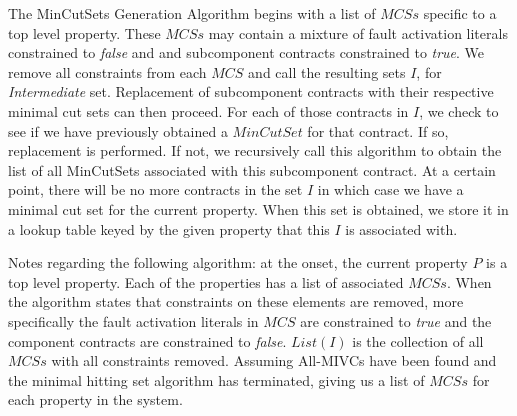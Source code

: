The MinCutSets Generation Algorithm begins with a list of $MCSs$ specific to a top level property. These $MCSs$ may contain a mixture of fault activation literals constrained to \textit{false} and %
and subcomponent contracts constrained to \textit{true}. We remove all constraints from each $MCS$ and call the resulting sets $I$, for \textit{Intermediate} set. Replacement of subcomponent contracts with their respective minimal cut sets can then proceed. For each of those contracts in $I$, we check to see if we have previously obtained a $MinCutSet$ for that contract. If so, replacement is performed. If not, we recursively call this algorithm to obtain the list of all %
MinCutSets associated with this subcomponent contract. At a certain point, there will be no more contracts in the set $I$ in which case we have a minimal cut set for the current property. When this set is obtained, we store it in a lookup table keyed by the given property that this $I$ is associated with. 


Notes regarding the following algorithm: at the onset, the current property $P$ is a top level property. Each of the properties has a list of associated $MCSs$. When the algorithm states that constraints on these elements are removed, more specifically the fault activation literals in $MCS$ are constrained to \textit{true} and the component contracts are constrained to \textit{false}. $List(I)$ is the collection of all $MCSs$ with all constraints removed. Assuming All-MIVCs have been found and the minimal hitting set algorithm has terminated, giving us a list of $MCSs$ for each property in the system. 


